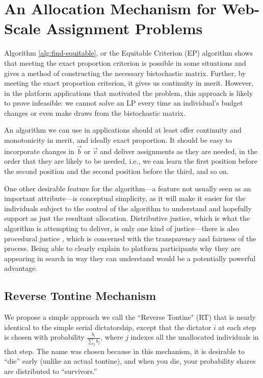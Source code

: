 \section{An Allocation Mechanism for Web-Scale Assignment Problems} 
Algorithm \ref{alg:find-equitable}, or the Equitable Criterion (EP)
algorithm shows that meeting the exact proportion criterion is
possible in some situations and gives a method of constructing the
necessary bistochastic matrix. Further, by meeting the exact proportion
criterion, it gives us continuity in merit. However, in the platform
applications that motivated the problem, this approach is likely to
prove infeasible: we cannot solve an LP every time an individual's
budget changes or even make draws from the bistochastic matrix.

An algorithm we can use in applications should at least offer
continuity and monotonicity in merit, and ideally exact proportion. It should be
easy to incorporate changes in $\vec{b}$ or $\vec{v}$ and deliver
assignments as they are needed, in the order that they are likely to
be needed, i.e., we can learn the first position before the second
position and the second position before the third, and so on.

One other desirable feature for the algorithm---a feature not usually
seen as an important attribute---is conceptual simplicity, as it will
make it easier for the individuals subject to the control of the
algorithm to understand and hopefully support as just the resultant
allocation. Distributive justice, which is what the algorithm is
attempting to deliver, is only one kind of justice---there is also
procedural justice \cite{rawls1999theory}, which is concerned with the
transparency and fairness of the process. Being able to clearly
explain to platform participants why they are appearing in search in
way they can understand would be a potentially powerful advantage.

\subsection{Reverse Tontine Mechanism}
\label{sec:tontine}
We propose a simple approach we call the ``Reverse Tontine" (RT) that
is nearly identical to the simple serial dictatorship, except that the
dictator $i$ at each step is chosen with probability
$\frac{b_i}{\sum_j b_j}$, where $j$ indexes all the unallocated
individuals in that step. The name was chosen because in this
mechanism, it is desirable to ``die'' early (unlike an actual
tontine), and when you die, your probability shares are distributed to
``survivors.''

